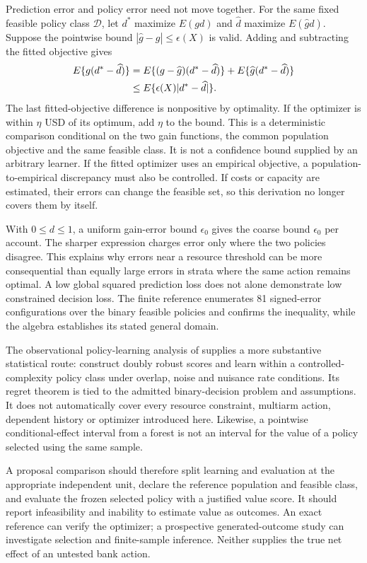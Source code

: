 Prediction error and policy error need not move together. For the same fixed
feasible policy class $\mathcal D$, let $d^*$ maximize $E(gd)$ and
$\widehat d$ maximize $E(\widehat g d)$. Suppose the pointwise bound
$|\widehat g-g|\leq\epsilon(X)$ is valid. Adding and subtracting the fitted
objective gives
\begin{align}
 E\{g(d^*-\widehat d)\}
 &=E\{(g-\widehat g)(d^*-\widehat d)\}
       +E\{\widehat g(d^*-\widehat d)\}\notag\\
 &\leq E\{\epsilon(X)|d^*-\widehat d|\}.
 \label{exec17:s4-regret-bound}
\end{align}
The last fitted-objective difference is nonpositive by optimality. If the
optimizer is within $\eta$ USD of its optimum, add $\eta$ to the bound.
This is a deterministic comparison conditional on the two gain functions,
the common population objective and the same feasible class. It is not a
confidence bound supplied by an arbitrary learner. If the fitted optimizer
uses an empirical objective, a population-to-empirical discrepancy must also
be controlled. If costs or capacity are estimated, their errors can change
the feasible set, so this derivation no longer covers them by itself.

With $0\leq d\leq1$, a uniform gain-error bound $\epsilon_0$ gives the coarse
bound $\epsilon_0$ per account. The sharper expression charges error only
where the two policies disagree. This explains why errors near a resource
threshold can be more consequential than equally large errors in strata
where the same action remains optimal. A low global squared prediction loss
does not alone demonstrate low constrained decision loss. The finite
reference enumerates 81 signed-error configurations over the binary feasible
policies and confirms the inequality, while the algebra establishes its stated
general domain.\citep{exec17_s4_math}

The observational policy-learning analysis of \citet{policy2021} supplies a
more substantive statistical route: construct doubly robust scores and learn
within a controlled-complexity policy class under overlap, noise and nuisance
rate conditions. Its regret theorem is tied to the admitted binary-decision
problem and assumptions. It does not automatically cover every resource
constraint, multiarm action, dependent history or optimizer introduced here.
Likewise, a pointwise conditional-effect interval from a forest is not an
interval for the value of a policy selected using the same sample.

A proposal comparison should therefore split learning and evaluation at the
appropriate independent unit, declare the reference population and feasible
class, and evaluate the frozen selected policy with a justified value score.
It should report infeasibility and inability to estimate value as outcomes.
An exact reference can verify the optimizer; a prospective generated-outcome
study can investigate selection and finite-sample inference. Neither supplies
the true net effect of an untested bank action.


